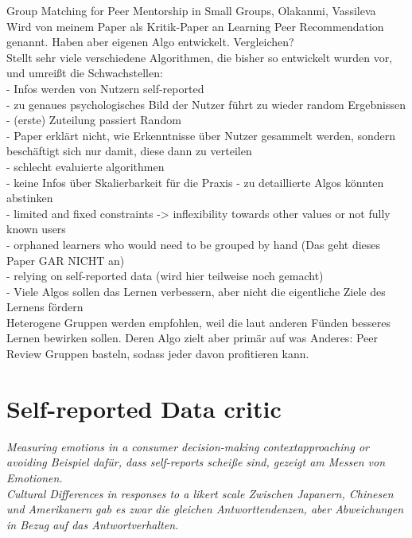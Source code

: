 \documentclass[nochapterpage,bigchapter,linedtoc,longdoc,colorback,accentcolor=tud3b,oneside]{tudreport}
\begin{document}
Group Matching for Peer Mentorship in Small Groups, Olakanmi, Vassileva \cite{olakanmi2017group}\\
Wird von meinem Paper als Kritik-Paper an Learning Peer Recommendation genannt. Haben aber eigenen Algo entwickelt. Vergleichen?\\
Stellt sehr viele verschiedene Algorithmen, die bisher so entwickelt wurden vor, und umreißt die Schwachstellen:\\
- Infos werden von Nutzern self-reported\\
- zu genaues psychologisches Bild der Nutzer führt zu wieder random Ergebnissen\\
- (erste) Zuteilung passiert Random\\
- Paper erklärt nicht, wie Erkenntnisse über Nutzer gesammelt werden, sondern beschäftigt sich nur damit, diese dann zu verteilen\\
- schlecht evaluierte algorithmen\\
- keine Infos über Skalierbarkeit für die Praxis - zu detaillierte Algos könnten abstinken\\
- limited and fixed constraints -> inflexibility towards other values or not fully known users\\
- orphaned learners who would need to be grouped by hand (Das geht dieses Paper GAR NICHT an)\\
- relying on self-reported data (wird hier teilweise noch gemacht)\\
- Viele Algos sollen das Lernen verbessern, aber nicht die eigentliche Ziele des Lernens fördern\\
Heterogene Gruppen werden empfohlen, weil die laut anderen Fünden besseres Lernen bewirken sollen. Deren Algo zielt aber primär auf was Anderes: Peer Review Gruppen basteln, sodass jeder davon profitieren kann.

\section{Self-reported Data critic}
\textit{Measuring emotions in a consumer decision-making contextapproaching or avoiding \cite{sorensen2008measuring}
Beispiel dafür, dass self-reports scheiße sind, gezeigt am Messen von Emotionen.}\\

\textit{Cultural Differences in responses to a likert scale \cite{lee2002cultural}
Zwischen Japanern, Chinesen und Amerikanern gab es zwar die gleichen Antworttendenzen, aber Abweichungen in Bezug auf das Antwortverhalten.}\\
\end{document}
